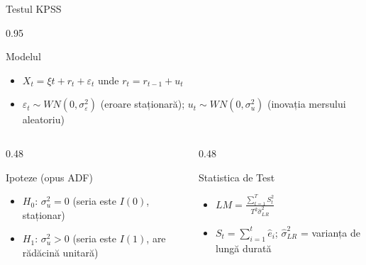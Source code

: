 \documentclass[9pt, aspectratio=169, t]{beamer}
\begin{document}
\begin{frame}{Testul KPSS}
    \begin{cminipage}{0.95\textwidth}
        \begin{block}{Modelul}
            \begin{itemize}\setlength{\itemsep}{0pt}
                \item $X_t = \xi t + r_t + \varepsilon_t$ unde $r_t = r_{t-1} + u_t$
                \item $\varepsilon_t \sim WN(0, \sigma_\varepsilon^2)$ (eroare staționară); \; $u_t \sim WN(0, \sigma_u^2)$ (inovația mersului aleatoriu)
            \end{itemize}
        \end{block}

        \vspace{0.1cm}

        \begin{columns}[T]
            \begin{column}{0.48\textwidth}
                \begin{exampleblock}{Ipoteze (opus ADF)}
                    \begin{itemize}\setlength{\itemsep}{0pt}
                        \item \textbf{$H_0$}: $\sigma_u^2 = 0$ \; (seria este $I(0)$, staționar)
                        \item \textbf{$H_1$}: $\sigma_u^2 > 0$ \; (seria este $I(1)$, are rădăcină unitară)
                    \end{itemize}
                \end{exampleblock}
            \end{column}
            \begin{column}{0.48\textwidth}
                \begin{block}{Statistica de Test}
                    \begin{itemize}\setlength{\itemsep}{0pt}
                        \item $LM = \frac{\sum_{t=1}^{T} S_t^2}{T^2 \hat{\sigma}^2_{LR}}$
                        \item {\small $S_t = \sum_{i=1}^{t} \hat{e}_i$; \; $\hat{\sigma}^2_{LR}$ = varianța de lungă durată}
                    \end{itemize}
                \end{block}
            \end{column}
        \end{columns}


\end{cminipage}
\end{frame}
\end{document}
